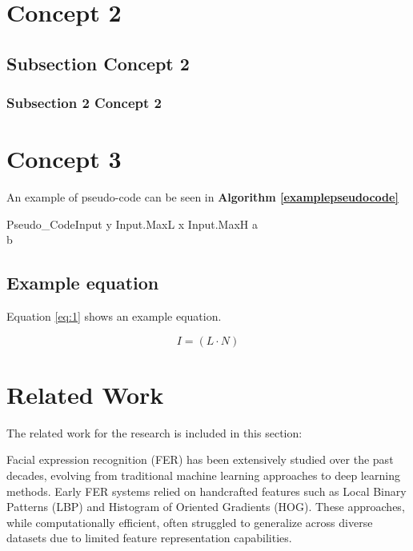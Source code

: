 \section{Concept 2}

\label{section:Concept2}

\subsection{Subsection Concept 2}

\subsubsection{Subsection 2 Concept 2}

\section{Concept 3}
An example of pseudo-code can be seen in \textbf{Algorithm \ref{examplepseudocode}}

\begin{pseudocode}{Pseudo\_Code}{Input} \label{examplepseudocode}
	\FOR y  \TO Input.MaxL \DO
	\BEGIN
	\FOR x  \TO Input.MaxH \DO
	\BEGIN
	a \GETS {}\\
	b \GETS {}\\
	\END
	\END
\end{pseudocode}


\subsection{Example equation}
 Equation \ref{eq:1} shows an example equation.

\[
I=(L\cdot N) \tag{1} \label{eq:1}
\]
  
\section{Related Work}

The related work for the research is included in this section:

Facial expression recognition (FER) has been extensively studied over the past decades, evolving from traditional machine learning approaches to deep learning methods. Early FER systems relied on handcrafted features such as Local Binary Patterns (LBP) and Histogram of Oriented Gradients (HOG). These approaches, while computationally efficient, often struggled to generalize across diverse datasets due to limited feature representation capabilities. 

